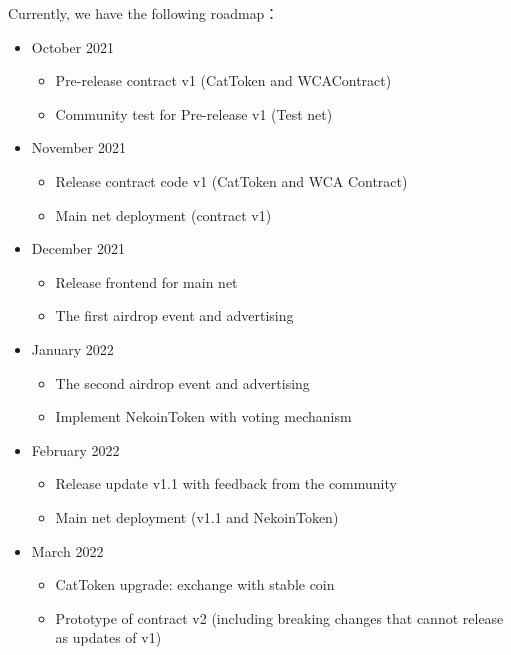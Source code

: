 Currently, we have the following roadmap：

\begin{itemize}
    \item October 2021
    \begin{itemize}
        \item Pre-release contract v1 (CatToken and WCAContract)
        \item Community test for Pre-release v1 (Test net)
    \end{itemize}

    \item November 2021
    \begin{itemize}
        \item Release contract code v1 (CatToken and WCA Contract)
        \item Main net deployment (contract v1)
    \end{itemize}

    \item December 2021
    \begin{itemize}
        \item Release frontend for main net
        \item The first airdrop event and advertising
    \end{itemize}

    \item January 2022
    \begin{itemize}
        \item The second airdrop event and advertising
        \item Implement NekoinToken with voting mechanism
    \end{itemize}

    \item February 2022
    \begin{itemize}
        \item Release update v1.1 with feedback from the community
        \item Main net deployment (v1.1 and NekoinToken)
    \end{itemize}

    \item March 2022
    \begin{itemize}
        \item CatToken upgrade: exchange with stable coin
        \item Prototype of contract v2 (including breaking changes that cannot release as updates of v1)
    \end{itemize}
\end{itemize}
